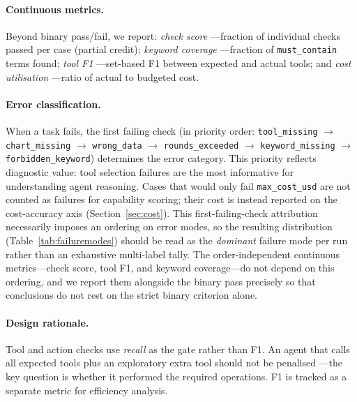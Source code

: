 \documentclass[sigconf]{acmart}
\begin{document}
\paragraph{Continuous metrics.} Beyond binary pass/fail, we report: \emph{check score} ---fraction of individual checks passed per case (partial credit); \emph{keyword coverage} ---fraction of \texttt{must\_contain} terms found; \emph{tool F1} ---set-based F1 between expected and actual tools; and \emph{cost utilisation} ---ratio of actual to budgeted cost.

\paragraph{Error classification.} When a task fails, the first failing check (in priority order: \texttt{tool\_missing} $\to$ \texttt{chart\_missing} $\to$ \texttt{wrong\_data} $\to$ \texttt{rounds\_exceeded} $\to$ \texttt{keyword\_missing} $\to$ \texttt{forbidden\_keyword}) determines the error category. This priority reflects diagnostic value: tool selection failures are the most informative for understanding agent reasoning. Cases that would only fail \texttt{max\_cost\_usd} are not counted as failures for capability scoring; their cost is instead reported on the cost-accuracy axis (Section~\ref{sec:cost}). This first-failing-check attribution necessarily imposes an ordering on error modes, so the resulting distribution (Table~\ref{tab:failuremodes}) should be read as the \emph{dominant} failure mode per run rather than an exhaustive multi-label tally. The order-independent continuous metrics---check score, tool F1, and keyword coverage---do not depend on this ordering, and we report them alongside the binary pass precisely so that conclusions do not rest on the strict binary criterion alone.

\paragraph{Design rationale.} Tool and action checks use \emph{recall} as the gate rather than F1. An agent that calls all expected tools plus an exploratory extra tool should not be penalised ---the key question is whether it performed the required operations. F1 is tracked as a separate metric for efficiency analysis.
\end{document}
